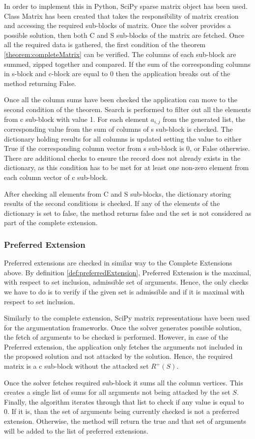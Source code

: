In order to implement this in Python, SciPy \citep{jones2014scipy} sparse matrix object has been used. Class Matrix has been created that takes the responsibility of matrix creation and accessing the required sub-blocks of matrix. Once the solver provides a possible solution, then both C and S sub-blocks of the matrix are fetched. Once all the required data is gathered, the first condition of the theorem \ref{theorem:completeMatrix} can be verified. The columns of each sub-block are summed, zipped together and compared. If the sum of the corresponding columns in s-block and c-block are equal to 0 then the application breaks out of the method returning False. 

Once all the column sums have been checked the application can move to the second condition of the theorem. Search is performed to filter out all the elements from c sub-block with value 1. For each element $a_{i,j}$ from the generated list, the corresponding value from the sum of columns of s sub-block is checked. The dictionary holding results for all columns is updated setting the value to either True if the corresponding column vector from s sub-block is 0, or False otherwise. There are additional checks to ensure the record does not already exists in the dictionary, as this condition has to be met for at least one non-zero element from each column vector of c sub-block.

After checking all elements from C and S sub-blocks, the dictionary storing results of the second conditions is checked. If any of the elements of the dictionary is set to false, the method returns false and the set is not considered as part of the complete extension. 

\subsubsection{Preferred Extension} \label{section:preferredExtension}
Preferred extensions are checked in similar way to the Complete Extensions above. By definition \ref{def:preferredExtension}, Preferred Extension is the maximal, with respect to set inclusion, admissible set of arguments. Hence, the only checks we have to do is to verify if the given set is admissible and if it is maximal with respect to set inclusion.

Similarly to the complete extension, SciPy matrix representations have been used for the argumentation frameworks. Once the solver generates possible solution, the fetch of arguments to be checked is performed. However, in case of the Preferred extension, the application only fetches the arguments not included in the proposed solution and not attacked by the solution. Hence, the required matrix is a c sub-block without the attacked set $R^+(S)$.
 
Once the solver fetches required sub-block it sums all the column vertices. This creates a single list of sums for all arguments not being attacked by the set $S$. Finally, the algorithm iterates through that list to check if any value is equal to 0. If it is, than the set of arguments being currently checked is not a preferred extension. Otherwise, the method will return the true and that set of arguments will be added to the list of preferred extensions.